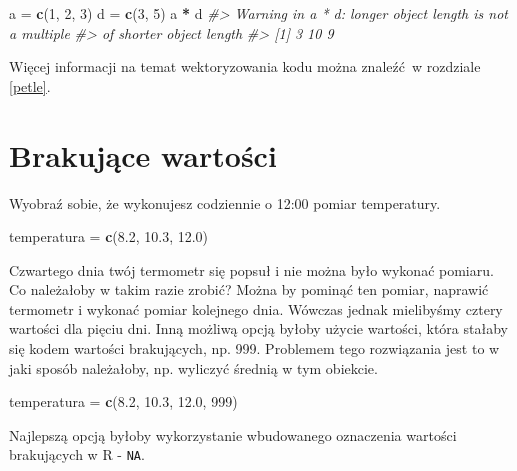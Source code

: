 \documentclass[paper=6in:9in,pagesize=pdftex,headinclude=on,footinclude=on,10pt]{scrbook}
\newenvironment{Shaded}{\begin{snugshade}}{\end{snugshade}}
\newcommand{\CommentTok}[1]{\textcolor[rgb]{0.56,0.35,0.01}{\textit{#1}}}
\newcommand{\DecValTok}[1]{\textcolor[rgb]{0.00,0.00,0.81}{#1}}
\newcommand{\FloatTok}[1]{\textcolor[rgb]{0.00,0.00,0.81}{#1}}
\newcommand{\KeywordTok}[1]{\textcolor[rgb]{0.13,0.29,0.53}{\textbf{#1}}}
\newcommand{\NormalTok}[1]{#1}
\newcommand{\OperatorTok}[1]{\textcolor[rgb]{0.81,0.36,0.00}{\textbf{#1}}}
\newcommand{\StringTok}[1]{\textcolor[rgb]{0.31,0.60,0.02}{#1}}
\begin{document}
\begin{Shaded}
\begin{Highlighting}[]
\NormalTok{a =}\StringTok{ }\KeywordTok{c}\NormalTok{(}\DecValTok{1}\NormalTok{, }\DecValTok{2}\NormalTok{, }\DecValTok{3}\NormalTok{)}
\NormalTok{d =}\StringTok{ }\KeywordTok{c}\NormalTok{(}\DecValTok{3}\NormalTok{, }\DecValTok{5}\NormalTok{)}
\NormalTok{a }\OperatorTok{*}\StringTok{ }\NormalTok{d}
\CommentTok{#> Warning in a * d: longer object length is not a multiple}
\CommentTok{#> of shorter object length}
\CommentTok{#> [1]  3 10  9}
\end{Highlighting}
\end{Shaded}

Więcej informacji na temat wektoryzowania kodu można znaleźć~w rozdziale \ref{petle}.

\hypertarget{na}{%
\section{Brakujące wartości}\label{na}}

Wyobraź sobie, że wykonujesz codziennie o 12:00 pomiar temperatury.

\begin{Shaded}
\begin{Highlighting}[]
\NormalTok{temperatura =}\StringTok{ }\KeywordTok{c}\NormalTok{(}\FloatTok{8.2}\NormalTok{, }\FloatTok{10.3}\NormalTok{, }\FloatTok{12.0}\NormalTok{)}
\end{Highlighting}
\end{Shaded}

Czwartego dnia twój termometr się popsuł i nie można było wykonać pomiaru.
Co należałoby w takim razie zrobić?
Można by pominąć ten pomiar, naprawić termometr i wykonać pomiar kolejnego dnia.
Wówczas jednak mielibyśmy cztery wartości dla pięciu dni.
Inną możliwą opcją byłoby użycie wartości, która stałaby się kodem wartości brakujących, np. 999.
Problemem tego rozwiązania jest to w jaki sposób należałoby, np. wyliczyć średnią w tym obiekcie.

\begin{Shaded}
\begin{Highlighting}[]
\NormalTok{temperatura =}\StringTok{ }\KeywordTok{c}\NormalTok{(}\FloatTok{8.2}\NormalTok{, }\FloatTok{10.3}\NormalTok{, }\FloatTok{12.0}\NormalTok{, }\DecValTok{999}\NormalTok{)}
\end{Highlighting}
\end{Shaded}

Najlepszą opcją byłoby wykorzystanie wbudowanego oznaczenia wartości brakujących w R - \texttt{NA}.
\end{document}
